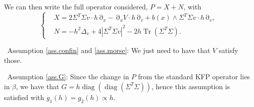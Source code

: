 \documentclass[12pt]{amsart}
\newcommand{\diag}{\operatorname{diag}}
\newcommand{\Tr}{{\operatorname{Tr}}}
\numberwithin{equation}{section}
\numberwithin{figure}{section}
\DeclareMathOperator{\p}{\partial}
\begin{document}
We can then write the full operator considered, $P = X + N$, with
\begin{equation*}
\left\{
\begin{aligned}
&X = 2\Sigma^T\Sigma v\cdot h\p_x - \p_xV\cdot h\p_v + b(x)\wedge\Sigma^T\Sigma v\cdot h\p_v,\\
&N = -h^2\Delta_v + 4|\Sigma^T\Sigma v|^2 - 2h\Tr(\Sigma^T\Sigma).
\end{aligned}
\right.
\end{equation*}

\textbullet\ Assumption \ref{ass.confin} and \ref{ass.morse}: We just need to have that $V$ satisfy those.

\textbullet\ Assumption \ref{ass.G}: Since the change in $P$ from the standard KFP operator lies in $\beta$, we have that $G = h\diag(\diag(\Sigma^T\Sigma))$, hence this assumption is satisfied with $g_1(h) = g_2(h) \propto h$.
\end{document}
